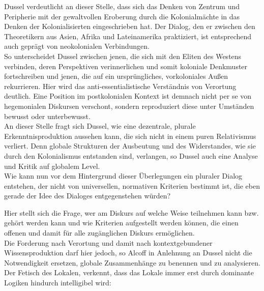 Dussel verdeutlicht an dieser Stelle, dass sich das Denken von Zentrum und
Peripherie mit der gewaltvollen Eroberung durch die Kolonialmächte in das Denken
der Kolonialisierten eingeschrieben hat. Der Dialog, den er zwischen den
Theoretikern aus Asien, Afrika und Lateinamerika praktiziert, ist entsprechend
auch geprägt von neokolonialen Verbindungen. \\
So unterscheidet Dussel zwischen
jenen, die sich mit den Eliten des Westens verbinden, deren Perspektiven
verinnerlichen und somit koloniale Denkmuster fortschreiben und jenen, die auf
ein ursprüngliches, vorkoloniales Außen rekurrieren. Hier wird das
anti-essentialistische Verständnis von Verortung deutlich. Eine Position im
postkolonialen Kontext\footnotemark {} ist demnach nicht per se von hegemonialen Diskursen
verschont, sondern reproduziert diese unter Umständen bewusst oder unterbewusst.
\\

An dieser Stelle fragt sich Dussel, wie eine dezentrale, plurale
Erkenntnisproduktion aussehen kann, die sich nicht in einem puren Relativismus
verliert. Denn globale Strukturen der Ausbeutung und des Widerstandes, wie sie
durch den Kolonialismus entstanden sind, verlangen, so Dussel auch eine Analyse
und Kritik auf globalem Level. \\
Wie kann nun vor dem Hintergrund dieser
Überlegungen ein pluraler Dialog entstehen, der nicht von universellen,
normativen Kriterien bestimmt ist, die eben gerade der Idee des Dialoges
entgegenstehen würden?

Hier stellt sich die Frage, wer am Diskurs auf welche Weise teilnehmen kann bzw.
gehört werden kann und wie Kriterien aufgestellt werden können, die einen
offenen und damit für alle zugänglichen Diskurs ermöglichen.
\\

Die Forderung nach Verortung und damit nach kontextgebundener Wissensproduktion
darf hier  jedoch, so Alcoff in Anlehnung an Dussel nicht die Notwendigkeit
ersetzen, globale Zusammenhänge zu benennen und zu analysieren. Der Fetisch des
Lokalen, verkennt, dass das Lokale immer erst durch dominante Logiken hindurch
intelligibel wird:

